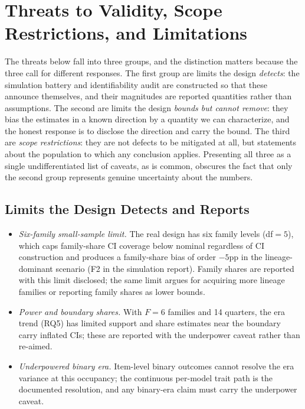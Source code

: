 \documentclass{ieeeaccess}
\theoremstyle{definition}
\theoremstyle{plain}
\begin{document}
\section{Threats to Validity, Scope Restrictions, and Limitations}
\label{sec:threats}
The threats below fall into three groups, and the distinction matters because
the three call for different responses. The first group are limits the design
\emph{detects}: the simulation battery and identifiability audit are
constructed so that these announce themselves, and their magnitudes are
reported quantities rather than assumptions. The second are limits the design
\emph{bounds but cannot remove}: they bias the estimates in a known direction
by a quantity we can characterize, and the honest response is to disclose the
direction and carry the bound. The third are \emph{scope restrictions}: they
are not defects to be mitigated at all, but statements about the population to
which any conclusion applies. Presenting all three as a single undifferentiated
list of caveats, as is common, obscures the fact that only the second group
represents genuine uncertainty about the numbers.

\subsection{Limits the Design Detects and Reports}
\begin{itemize}
\item \emph{Six-family small-sample limit.} The real design has six family levels
  (df$=5$), which caps family-share CI coverage below nominal regardless of CI
  construction and produces a family-share bias of order $-5$pp in the
  lineage-dominant scenario (F2 in the simulation report). Family shares are
  reported with this limit disclosed; the same limit argues for acquiring more
  lineage families or reporting family shares as lower bounds.
\item \emph{Power and boundary shares.} With $F=6$ families and 14 quarters, the
  era trend (RQ5) has limited support and share estimates near the boundary carry
  inflated CIs; these are reported with the underpower caveat rather than re-aimed.
\item \emph{Underpowered binary era.} Item-level binary outcomes cannot resolve
  the era variance at this occupancy; the continuous per-model trait path is the
  documented resolution, and any binary-era claim must carry the underpower caveat.
\end{itemize}
\end{document}
